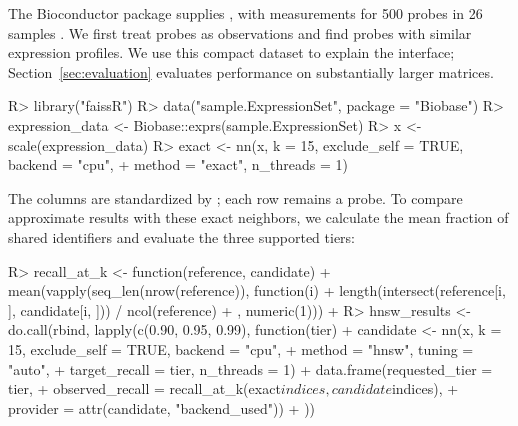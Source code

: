 \documentclass[article]{jss}
\newcommand{\fct}[1]{\code{#1()}}
\begin{document}
The Bioconductor  package supplies ,
with measurements for 500 probes in 26 samples \citep{HuberEtAl2015}. We first
treat probes as observations and find probes with similar expression profiles.
We use this compact dataset to explain the interface; Section~\ref{sec:evaluation}
evaluates performance on substantially larger matrices.
\begin{CodeChunk}
\begin{CodeInput}
R> library("faissR")
R> data("sample.ExpressionSet", package = "Biobase")
R> expression_data <- Biobase::exprs(sample.ExpressionSet)
R> x <- scale(expression_data)
R> exact <- nn(x, k = 15, exclude_self = TRUE, backend = "cpu",
+             method = "exact", n_threads = 1)
\end{CodeInput}
\end{CodeChunk}
The columns are standardized by \fct{scale}; each row remains a probe. To
compare approximate results with these exact neighbors, we calculate the
mean fraction of shared identifiers and evaluate the three supported tiers:
\begin{CodeChunk}
\begin{CodeInput}
R> recall_at_k <- function(reference, candidate) {
+    mean(vapply(seq_len(nrow(reference)), function(i) {
+      length(intersect(reference[i, ], candidate[i, ])) / ncol(reference)
+    }, numeric(1)))
+  }
R> hnsw_results <- do.call(rbind, lapply(c(0.90, 0.95, 0.99), function(tier) {
+    candidate <- nn(x, k = 15, exclude_self = TRUE, backend = "cpu",
+                    method = "hnsw", tuning = "auto",
+                    target_recall = tier, n_threads = 1)
+    data.frame(requested_tier = tier,
+               observed_recall = recall_at_k(exact$indices, candidate$indices),
+               provider = attr(candidate, "backend_used"))
+  }))
\end{CodeInput}
\end{CodeChunk}
\end{document}
